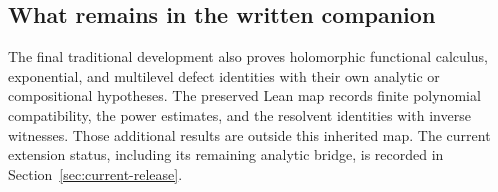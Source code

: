 \subsection{What remains in the written companion}

The final traditional development also proves holomorphic functional calculus, exponential, and multilevel defect identities with their own analytic or compositional hypotheses. The preserved Lean map records finite polynomial compatibility, the power estimates, and the resolvent identities with inverse witnesses. Those additional results are outside this inherited map. The current extension status, including its remaining analytic bridge, is recorded in Section~\ref{sec:current-release}.
